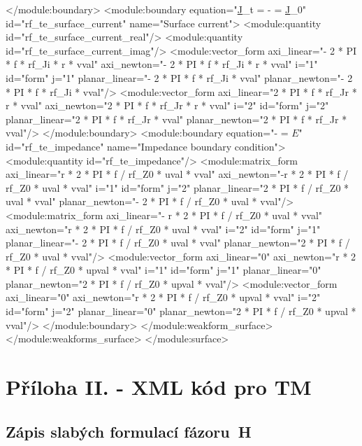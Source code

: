 \documentclass[12pt,a4paper,oneside]{article}
\numberwithin{equation}{section} %
\numberwithin{figure}{section} %
\numberwithin{table}{section} %
\newcommand{\mj}{\mathrm{j}} %
\newcommand{\faz}[1]{{\underline{#1}}} %
\newcommand{\vecfaz}[1]{\mbox{\underline{\boldmath$#1$}}} %
\begin{document}
\begin{spverbatim}
        </module:boundary>
        <module:boundary equation="\faz{J}_{t} = -  \frac{\partial \vecfaz{E}}{\partial n_0} = \faz{J}_0" id="rf_te_surface_current" name="Surface current">
          <module:quantity id="rf_te_surface_current_real"/>
          <module:quantity id="rf_te_surface_current_imag"/>
          <module:vector_form axi_linear="- 2 * PI * f * rf_Ji * r * vval" axi_newton="- 2 * PI * f * rf_Ji * r * vval" i="1" id="form" j="1" planar_linear="- 2 * PI * f * rf_Ji * vval" planar_newton="- 2 * PI * f * rf_Ji * vval"/>
          <module:vector_form axi_linear="2 * PI * f * rf_Jr * r * vval" axi_newton="2 * PI * f * rf_Jr * r * vval" i="2" id="form" j="2" planar_linear="2 * PI * f * rf_Jr * vval" planar_newton="2 * PI * f * rf_Jr * vval"/>
        </module:boundary>
        <module:boundary equation="-  \frac{\partial \vecfaz{E}}{\partial n_0} = \sqrt{\frac{\varepsilon - \mj \sigma / \omega}{\mu}} \vecfaz{E}" id="rf_te_impedance" name="Impedance boundary condition">
          <module:quantity id="rf_te_impedance"/>
          <module:matrix_form axi_linear="r * 2 * PI * f / rf_Z0 * uval * vval" axi_newton="-r * 2 * PI * f / rf_Z0 * uval * vval" i="1" id="form" j="2" planar_linear="2 * PI * f / rf_Z0 * uval * vval" planar_newton="- 2 * PI * f / rf_Z0 * uval * vval"/>
          <module:matrix_form axi_linear="- r * 2 * PI * f / rf_Z0 * uval * vval" axi_newton="r * 2 * PI * f / rf_Z0 * uval * vval" i="2" id="form" j="1" planar_linear="- 2 * PI * f / rf_Z0 * uval * vval" planar_newton="2 * PI * f / rf_Z0 * uval * vval"/>
          <module:vector_form axi_linear="0" axi_newton="r * 2 * PI * f / rf_Z0 * upval * vval" i="1" id="form" j="1" planar_linear="0" planar_newton="2 * PI * f / rf_Z0 * upval * vval"/>
          <module:vector_form axi_linear="0" axi_newton="r * 2 * PI * f / rf_Z0 * upval * vval" i="2" id="form" j="2" planar_linear="0" planar_newton="2 * PI * f / rf_Z0 * upval * vval"/>
        </module:boundary>
      </module:weakform_surface>
    </module:weakforms_surface>
  </module:surface>
\end{spverbatim}


\newpage
\section*{Příloha II. - XML kód pro TM}
\subsection*{Zápis slabých formulací fázoru~H}
\label{xmlH}
\end{document}
